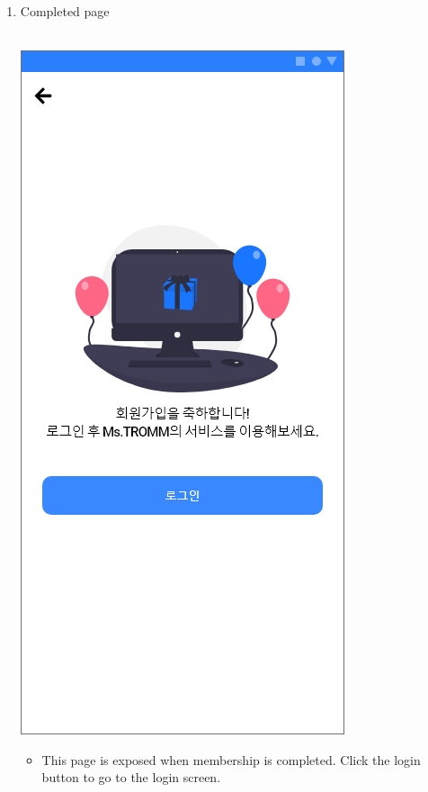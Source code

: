\documentclass[conference]{IEEEtran}
\begin{document}
\begin{enumerate}
\begin{itemize}
    \end{itemize}
    \item Completed page \\ \\
    \centerline{\includegraphics[scale=0.32]{회원가입5.jpg}}
        \begin{itemize}
        \item[] This page is exposed when membership is completed. Click the login button to go to the login screen.
    \end{itemize}
    \end{enumerate}
\end{document}
